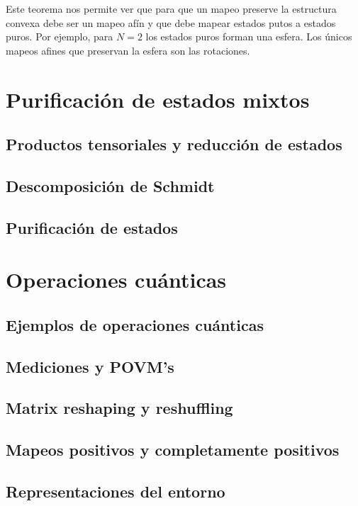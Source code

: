 \documentclass[11pt,dvipsnames]{report}
\begin{document}
Este teorema nos permite ver que para que un mapeo preserve la estructura 
convexa debe ser un mapeo afín y que debe mapear estados putos
a estados puros. Por ejemplo, para $N=2$ los estados puros forman una
esfera. Los únicos mapeos afines que preservan la esfera son las rotaciones.



\chapter{Purificación de estados mixtos}

\section{Productos tensoriales y reducción de estados}

\section{Descomposición de Schmidt}

\section{Purificación de estados}



\chapter{Operaciones cuánticas}

\section{Ejemplos de operaciones cuánticas}

\section{Mediciones y POVM's}

\section{Matrix reshaping y reshuffling}

\section{Mapeos positivos y completamente positivos}

\section{Representaciones del entorno}
\end{document}
